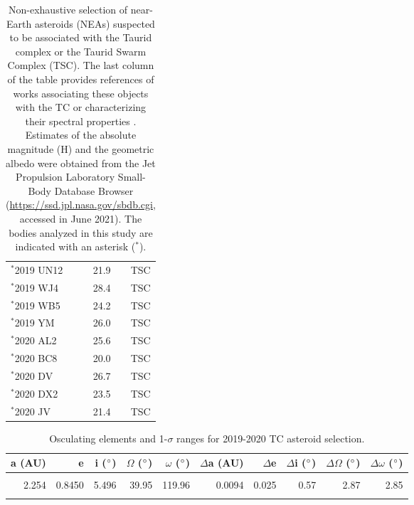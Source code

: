 \documentclass[letters,a4paper,fleqn,usenatbib]{mnras}
\begin{document}
\begin{table*}
{\begin{tabular}{llllll}
  $^*$2019 UN12 &   &  & 21.9 &    & TSC \\
  $^*$2019 WJ4  &   &  & 28.4 &    & TSC \\
  $^*$2019 WB5  &   &  & 24.2 &    & TSC \\
  $^*$2019 YM   &   &  & 26.0 &    & TSC \\
  $^*$2020 AL2  &   &  & 25.6 &    & TSC \\
  $^*$2020 BC8  &   &  & 20.0 &    & TSC \\
  $^*$2020 DV   &   &  & 26.7 &    & TSC \\
  $^*$2020 DX2  &   &  & 23.5 &    & TSC \\
  $^*$2020 JV   &   &  & 21.4 &    & TSC \\
  \hline
  \hline
  \end{tabular}}
  \caption{\label{tab:TC_asteroids} Non-exhaustive selection of near-Earth asteroids (NEAs) suspected to be associated with the Taurid complex or the Taurid Swarm Complex (TSC). The last column of the table provides references of works associating these objects with the TC or characterizing their spectral properties \citep[e.g.][]{Popescu2014,Tubiana2015}. Estimates of the absolute magnitude (H) and the geometric albedo were obtained from the Jet Propulsion Laboratory Small-Body Database Browser (\url{https://ssd.jpl.nasa.gov/sbdb.cgi}, accessed in June 2021). The bodies analyzed in this study are indicated with an asterisk ($^*$).}
 \end{table*}

\begin{table*}
	\begin{tabular}{rrrrrrrrrr}
		a (AU) & e & i ($\degree$) & $\Omega$ ($\degree$) & $\omega$ ($\degree$) & $\Delta$a (AU) & $\Delta$e & $\Delta$i ($\degree$) & $\Delta\Omega$ ($\degree$) & $\Delta\omega$  ($\degree$)\\
		\hline
		\hline
		& & & & & & & & & \\[-0.2cm]
		2.254 & 0.8450 & 5.496 & 39.95 & 119.96 & 0.0094 & 0.025 & 0.57 & 2.87 & 2.85 \\
		& & & & & & & & & \\[-0.2cm]
		\hline  
		\hline
	\end{tabular} 
	\caption{Osculating elements and 1-$\sigma$ ranges for 2019-2020 TC asteroid selection.}
	\label{tab:TC2019}
\end{table*}
\end{document}
